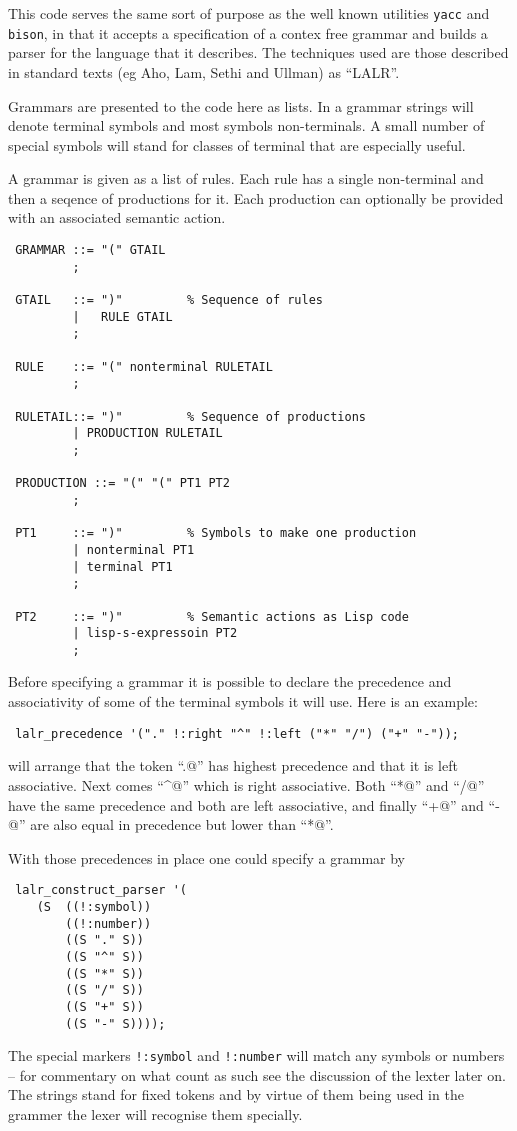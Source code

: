 
This code serves the same sort of purpose as the well known utilities
\verb+yacc+ and \verb+bison+, in that it accepts a specification of a
contex free grammar and builds a parser for the language that it describes.
The techniques used are those described in standard texts (eg Aho, Lam,
Sethi and Ullman) as ``LALR''.

Grammars are presented to the code here as lists. In a grammar
strings will denote terminal symbols and most symbols non-terminals. A
small number of special symbols will stand for classes of terminal that
are especially useful.

A grammar is given as a list of rules. Each rule has a single non-terminal
and then a seqence of productions for it. Each production can optionally
be provided with an associated semantic action.

\begin{verbatim}
 GRAMMAR ::= "(" GTAIL
         ;

 GTAIL   ::= ")"         % Sequence of rules
         |   RULE GTAIL
         ;

 RULE    ::= "(" nonterminal RULETAIL
         ;

 RULETAIL::= ")"         % Sequence of productions
         | PRODUCTION RULETAIL
         ;

 PRODUCTION ::= "(" "(" PT1 PT2
         ;

 PT1     ::= ")"         % Symbols to make one production
         | nonterminal PT1
         | terminal PT1
         ;

 PT2     ::= ")"         % Semantic actions as Lisp code
         | lisp-s-expressoin PT2
         ; 
\end{verbatim}

Before specifying a grammar it is possible to declare the precedence and
associativity of some of the terminal symbols it will use. Here is an
example:
\begin{verbatim}
 lalr_precedence '("." !:right "^" !:left ("*" "/") ("+" "-"));
\end{verbatim}
\noindent will arrange that the token ``\verb@.@'' has highest precedence
and that it is left associative. Next comes ``\verb@^@'' which is right
associative.
Both ``\verb@*@'' and ``\verb@/@'' have the same precedence and both are
left associative, and finally ``\verb@+@'' and ``\verb@-@'' are also equal
in precedence but lower than ``\verb@*@''.

With those precedences in place one could specify a grammar by
\begin{verbatim}
 lalr_construct_parser '(
    (S  ((!:symbol))
        ((!:number))
        ((S "." S))
        ((S "^" S))
        ((S "*" S))
        ((S "/" S))
        ((S "+" S))
        ((S "-" S))));
\end{verbatim}

The special markers \verb+!:symbol+ and \verb+!:number+ will match any
symbols or numbers -- for commentary on what count as such see the discussion
of the lexter later on. The strings stand for fixed tokens and by virtue
of them being used in the grammer the lexer will recognise them specially.

